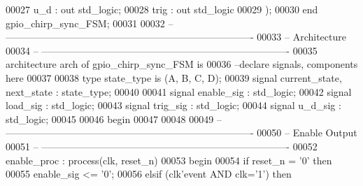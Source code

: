 \begin{DoxyCode}
00027         \textcolor{vhdlchar}{u_d}                 \textcolor{vhdlchar}{:} \textcolor{keywordflow}{out} \textcolor{comment}{std\_logic};
00028         \textcolor{vhdlchar}{trig}                    \textcolor{vhdlchar}{:} \textcolor{keywordflow}{out} \textcolor{comment}{std\_logic}
00029         \textcolor{vhdlchar}{)};
00030 \textcolor{keywordflow}{end} \textcolor{vhdlchar}{gpio\_chirp\_sync\_FSM};
00031 
00032 \textcolor{keyword}{-- ----------------------------------------------------------------------------}
00033 \textcolor{keyword}{-- Architecture}
00034 \textcolor{keyword}{-- ----------------------------------------------------------------------------}
00035 \textcolor{keywordflow}{architecture} arch \textcolor{keywordflow}{of} gpio_chirp_sync_FSM is
00036 \textcolor{keyword}{--declare signals,  components here}
00037 
00038 \textcolor{keywordflow}{type} \textcolor{vhdlchar}{state_type} \textcolor{keywordflow}{is} \textcolor{vhdlchar}{(}\textcolor{vhdlchar}{A}\textcolor{vhdlchar}{,} \textcolor{vhdlchar}{B}\textcolor{vhdlchar}{,} \textcolor{vhdlchar}{C}\textcolor{vhdlchar}{,} \textcolor{vhdlchar}{D}\textcolor{vhdlchar}{)};
00039 \textcolor{keywordflow}{signal} \textcolor{vhdlchar}{current_state}\textcolor{vhdlchar}{,} \textcolor{vhdlchar}{next_state} \textcolor{vhdlchar}{:} \textcolor{vhdlchar}{state_type};
00040 
00041 \textcolor{keywordflow}{signal} \textcolor{vhdlchar}{enable_sig}   \textcolor{vhdlchar}{:} \textcolor{comment}{std\_logic};
00042 \textcolor{keywordflow}{signal} \textcolor{vhdlchar}{load_sig}         \textcolor{vhdlchar}{:} \textcolor{comment}{std\_logic};
00043 \textcolor{keywordflow}{signal} \textcolor{vhdlchar}{trig_sig}     \textcolor{vhdlchar}{:} \textcolor{comment}{std\_logic};
00044 \textcolor{keywordflow}{signal} \textcolor{vhdlchar}{u_d_sig}      \textcolor{vhdlchar}{:} \textcolor{comment}{std\_logic};
00045   
00046 \textcolor{vhdlkeyword}{begin}
00047 
00048 
00049 \textcolor{keyword}{-- ----------------------------------------------------------------------------}
00050 \textcolor{keyword}{-- Enable Output}
00051 \textcolor{keyword}{-- ----------------------------------------------------------------------------}
00052 enable\_proc : \textcolor{keywordflow}{process}(clk, reset_n)
00053 \textcolor{vhdlkeyword}{begin}
00054    \textcolor{keywordflow}{if} \textcolor{vhdlchar}{reset_n} \textcolor{vhdlchar}{=} \textcolor{vhdlchar}{'}\textcolor{vhdllogic}{}\textcolor{vhdllogic}{0}\textcolor{vhdlchar}{'} \textcolor{keywordflow}{then} 
00055       enable\_sig <= '0';
00056    \textcolor{keywordflow}{elsif} \textcolor{vhdlchar}{(}\textcolor{vhdlchar}{clk}\textcolor{vhdlchar}{'}\textcolor{vhdlkeyword}{event} \textcolor{keywordflow}{AND} \textcolor{vhdlchar}{clk}\textcolor{vhdlchar}{=}\textcolor{vhdlchar}{'}\textcolor{vhdllogic}{}\textcolor{vhdllogic}{1}\textcolor{vhdlchar}{'}\textcolor{vhdlchar}{)} \textcolor{keywordflow}{then} 

\end{DoxyCode}
